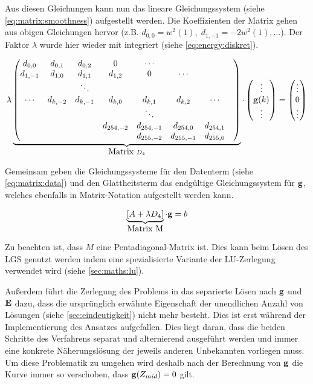 Aus diesen Gleichungen kann nun das lineare Gleichungssystem (siehe \autoref{eq:matrix:smoothness}) aufgestellt werden. Die  Koeffizienten der Matrix gehen aus obigen Gleichungen hervor (z.B. $d_{0,0} = w^2(1), \; d_{1,-1} = -2w^2(1), \dots$). Der Faktor $\lambda$ wurde hier wieder mit integriert (siehe \autoref{eq:energy:diskret}).

\begin{align}
\label{eq:matrix:smoothness}
\lambda
\underbrace{
\begin{pmatrix}
d_{0,0} & d_{0,1} & d_{0,2} & 0 &\cdots\\
d_{1,-1} & d_{1,0} & d_{1,1} & d_{1,2} & 0 &\cdots\\
&  & \ddots &  \\
\cdots  & d_{k,-2} & d_{k,-1} & d_{k,0}&d_{k,1} &d_{k,2} & \cdots\\
&&&&\ddots&&&\\
&&&d_{254,-2}&d_{254,-1}&d_{254,0}&d_{254,1}\\
&&&&d_{255,-2}&d_{255,-1}&d_{255,0}\\
\end{pmatrix}}_{\mbox{Matrix } D_4}
\cdot
\begin{pmatrix}
\vdots\\
\mathbf g(k)\\
\vdots
\end{pmatrix}
= 
\begin{pmatrix}
\vdots\\
0\\
\vdots
\end{pmatrix}
\end{align}


Gemeinsam geben die Gleichungssysteme für den Datenterm (siehe \autoref{eq:matrix:data}) und den Glattheitsterm das endgültige Gleichungssystem für $\mathbf g$, welches ebenfalls in Matrix-Notation aufgestellt werden kann.
 
\begin{align}
\label{eq:g:lgs}
\underbrace{[A+\lambda D_4]}_{\mbox{Matrix M}}\cdot \mathbf g = b
\end{align}

Zu beachten ist, dass $M$ eine \gls{Pentadiagonal-Matrix} ist. Dies kann beim Lösen des \gls{LGS} genutzt werden indem eine spezialisierte Variante der LU-Zerlegung verwendet wird (siehe \autoref{sec:maths:lu}).

Außerdem führt die Zerlegung des Problems in das separierte Lösen nach $\mathbf g$ und $\mathbf E$ dazu, dass die ursprünglich erwähnte Eigenschaft der unendlichen Anzahl von Lösungen (siehe \autoref{sec:eindeutigkeit}) nicht mehr besteht. Dies ist erst während der Implementierung des Ansatzes aufgefallen. Dies liegt daran, dass die beiden Schritte des Verfahrens separat und alternierend ausgeführt werden und immer eine konkrete Näherungslösung der jeweils anderen Unbekannten vorliegen muss.
Um diese Problematik zu umgehen wird deshalb nach der Berechnung von $\mathbf g$ die Kurve immer so verschoben, dass $\mathbf g(Z_{mid}) = 0$ gilt. 

